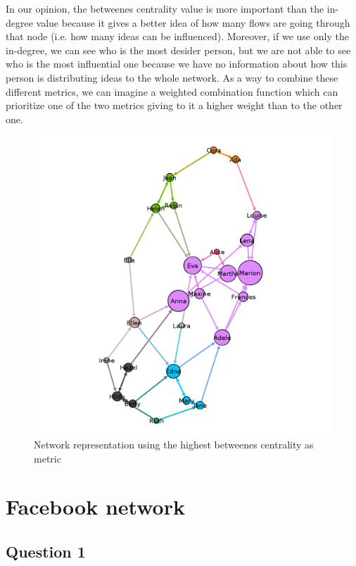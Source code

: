\documentclass[a4paper]{article}
\begin{document}
In our opinion, the betweenes centrality value is more important than the in-degree value because it gives a better idea of how many flows are going through that node (i.e. how many ideas can be influenced). Moreover, if we use only the in-degree, we can see who is the most desider person, but we are not able to see who is the most influential one because we have no information about how this person is distributing ideas to the whole network.
As a way to combine these different metrics, we can imagine a weighted combination function which can prioritize one of the two metrics giving to it a higher weight than to the other one.

\begin{figure}[!htpb]
\centering
\includegraphics[width=\textwidth]{res/img/network_output}
\caption{Network representation using the highest betweenes centrality as metric}
\label{fig:network_output}
\end{figure}

\section{Facebook network}

\subsection{Question 1}
\end{document}
